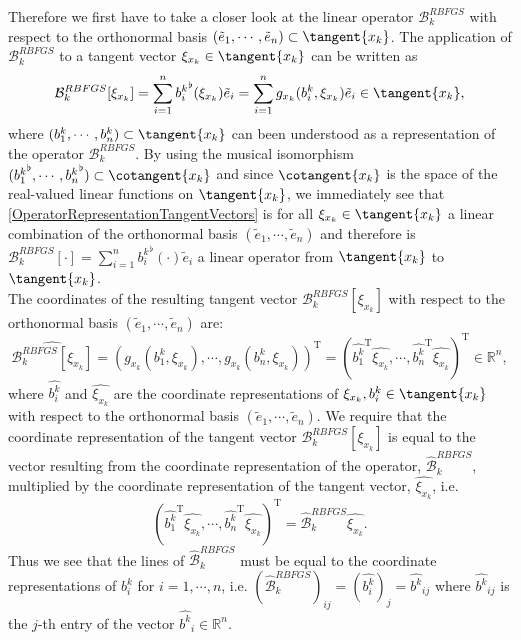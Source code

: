 Therefore we first have to take a closer look at the linear operator $\mathcal{B}^{RBFGS}_k$ with respect to the orthonormal basis $(\tilde{e}_1, \cdots, \tilde{e}_n) \subset \tangent{x_k}$. The application of $\mathcal{B}^{RBFGS}_k$ to a tangent vector $\xi_{x_k} \in \tangent{x_k}$ can be written as
\begin{equation}\label{OperatorRepresentationTangentVectors}
    \mathcal{B}^{RBFGS}_k [\xi_{x_k}] = \sum^{n}_{i=1} {b^{k}_i}^{\flat} (\xi_{x_k}) \tilde{e}_i = \sum^{n}_{i=1} g_{x_k} (b^{k}_i, \xi_{x_k}) \tilde{e}_i \in \tangent{x_k},
\end{equation}
where $(b^{k}_1, \cdots, b^{k}_n) \subset \tangent{x_k}$ can been understood as a representation of the operator $\mathcal{B}^{RBFGS}_k$. By using the musical isomorphism $({b^{k}_1}^{\flat}, \cdots, {b^{k}_n}^{\flat}) \subset \cotangent{x_k}$ and since $\cotangent{x_k}$ is the space of the real-valued linear functions on $\tangent{x_k}$, we immediately see that \cref{OperatorRepresentationTangentVectors} is for all $\xi_{x_k} \in \tangent{x_k}$ a linear combination of the orthonormal basis $(\tilde{e}_1, \cdots, \tilde{e}_n)$ and therefore is $\mathcal{B}^{RBFGS}_k [\cdot] = \sum^{n}_{i=1} {b^{k}_i}^{\flat} (\cdot) \tilde{e}_i$ a linear operator from $\tangent{x_k}$ to $\tangent{x_k}$. \\
The coordinates of the resulting tangent vector $\mathcal{B}^{RBFGS}_k [\xi_{x_k}]$ with respect to the orthonormal basis $(\tilde{e}_1, \cdots, \tilde{e}_n)$ are:
\begin{equation*}
    \widehat{\mathcal{B}^{RBFGS}_k [\xi_{x_k}]} = (g_{x_k} (b^{k}_1, \xi_{x_k}), \cdots, g_{x_k} (b^{k}_n, \xi_{x_k}))^{\mathrm{T}} = (\hat{b^{k}_1}^{\mathrm{T}} \hat{\xi_{x_k}}, \cdots, \hat{b^{k}_n}^{\mathrm{T}} \hat{\xi_{x_k}})^{\mathrm{T}} \in \mathbb{R}^n,
\end{equation*}
where $\hat{b^{k}_i}$ and $\hat{\xi_{x_k}}$ are the coordinate representations of $\xi_{x_k}, b^{k}_i \in \tangent{x_k}$ with respect to the orthonormal basis $(\tilde{e}_1, \cdots, \tilde{e}_n)$. We require that the coordinate representation of the tangent vector $\mathcal{B}^{RBFGS}_k [\xi_{x_k}]$ is equal to the vector resulting from the coordinate representation of the operator, $\hat{\mathcal{B}}^{RBFGS}_k$, multiplied by the coordinate representation of the tangent vector, $\hat{\xi_{x_k}}$, i.e.
\begin{equation*}
    (\hat{b^{k}_1}^{\mathrm{T}} \hat{\xi_{x_k}}, \cdots, \hat{b^{k}_n}^{\mathrm{T}} \hat{\xi_{x_k}})^{\mathrm{T}} = \hat{\mathcal{B}}^{RBFGS}_k \hat{\xi_{x_k}}.
\end{equation*}
Thus we see that the lines of $\hat{\mathcal{B}}^{RBFGS}_k$ must be equal to the coordinate representations of $b^{k}_i$ for $i = 1, \cdots, n$, i.e. $(\hat{\mathcal{B}}^{RBFGS}_k)_{ij} = (\hat{b^{k}_i})_j = \hat{b^{k}}_{ij}$ where $\hat{b^{k}}_{ij}$ is the $j$-th entry of the vector $\hat{b^{k}}_i \in \mathbb{R}^n$. \\


